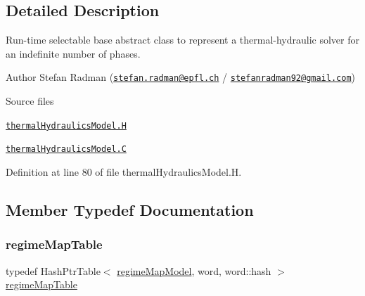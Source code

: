 \subsection{Detailed Description}
Run-\/time selectable base abstract class to represent a thermal-\/hydraulic solver for an indefinite number of phases. 

\label{_Description}%
 Author Stefan Radman (\href{mailto:stefan.radman@epfl.ch}{\tt stefan.\+radman@epfl.\+ch} / \href{mailto:stefanradman92@gmail.com}{\tt stefanradman92@gmail.\+com})

\begin{DoxyParagraph}{Source files}

\begin{DoxyItemize}
\item \href{../../../home/carlo/data/GeN-Foam/GeN-Foam_ffn/GeN-Foam/GeN-Foam/classes/thermalHydraulics/solvers/thermalHydraulicsModel.H}{\tt thermal\+Hydraulics\+Model.\+H} 
\item \href{../../../home/carlo/data/GeN-Foam/GeN-Foam_ffn/GeN-Foam/GeN-Foam/classes/thermalHydraulics/solvers/thermalHydraulicsModel.C}{\tt thermal\+Hydraulics\+Model.\+C} 
\end{DoxyItemize}
\end{DoxyParagraph}


Definition at line 80 of file thermal\+Hydraulics\+Model.\+H.



\subsection{Member Typedef Documentation}
\mbox{\label{classFoam_1_1thermalHydraulicsModel_a988a92d1e4c95a1031e163a28d4d4d39}} 
\subsubsection{\texorpdfstring{regime\+Map\+Table}{regimeMapTable}}
{\footnotesize\ttfamily typedef Hash\+Ptr\+Table$<$ \hyperlink{classFoam_1_1regimeMapModel}{regime\+Map\+Model}, word, word\+::hash $>$ \hyperlink{classFoam_1_1thermalHydraulicsModel_a988a92d1e4c95a1031e163a28d4d4d39}{regime\+Map\+Table}\hspace{0.3cm}{\ttfamily [protected]}}



